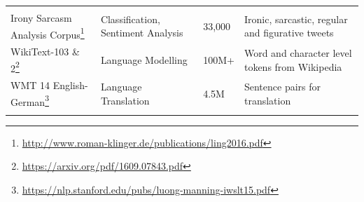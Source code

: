 \documentclass[]{krantz}
\renewcommand{\href}[2]{#2\footnote{\url{#1}}}
\begin{document}
\begin{longtable}[]{@{}llll@{}}
\begin{minipage}[t]{0.23\columnwidth}
\end{minipage}\tabularnewline
\begin{minipage}[t]{0.31\columnwidth}\raggedright
\href{http://www.roman-klinger.de/publications/ling2016.pdf}{Irony Sarcasm Analysis Corpus}\strut
\end{minipage} & \begin{minipage}[t]{0.24\columnwidth}\raggedright
Classification, Sentiment Analysis\strut
\end{minipage} & \begin{minipage}[t]{0.10\columnwidth}\raggedright
33,000\strut
\end{minipage} & \begin{minipage}[t]{0.23\columnwidth}\raggedright
Ironic, sarcastic, regular and figurative tweets\strut
\end{minipage}\tabularnewline
\begin{minipage}[t]{0.31\columnwidth}\raggedright
\href{https://arxiv.org/pdf/1609.07843.pdf}{WikiText-103 \& 2}\strut
\end{minipage} & \begin{minipage}[t]{0.24\columnwidth}\raggedright
Language Modelling\strut
\end{minipage} & \begin{minipage}[t]{0.10\columnwidth}\raggedright
100M+\strut
\end{minipage} & \begin{minipage}[t]{0.23\columnwidth}\raggedright
Word and character level tokens from Wikipedia\strut
\end{minipage}\tabularnewline
\begin{minipage}[t]{0.31\columnwidth}\raggedright
\href{https://nlp.stanford.edu/pubs/luong-manning-iwslt15.pdf}{WMT 14 English-German}\strut
\end{minipage} & \begin{minipage}[t]{0.24\columnwidth}\raggedright
Language Translation\strut
\end{minipage} & \begin{minipage}[t]{0.10\columnwidth}\raggedright
4.5M\strut
\end{minipage} & \begin{minipage}[t]{0.23\columnwidth}\raggedright
Sentence pairs for translation\strut
\end{minipage}\tabularnewline
\begin{minipage}[t]{0.31\columnwidth}\raggedright
\strut
\end{minipage} & \begin{minipage}[t]{0.24\columnwidth}\raggedright

\end{minipage}
\end{longtable}
\end{document}
